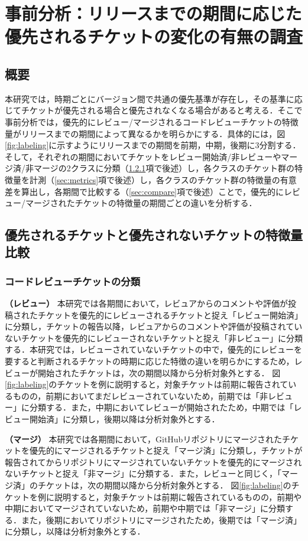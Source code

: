 \documentclass[submit]{ipsj}
\begin{document}
\section{事前分析：リリースまでの期間に応じた優先されるチケットの変化の有無の調査}\label{sec:pre_analysis}

\subsection{概要}
本研究では，時期ごとにバージョン間で共通の優先基準が存在し，その基準に応じてチケットが優先される場合と優先されなくなる場合があると考える．そこで事前分析では，優先的にレビュー/マージされるコードレビューチケットの特徴量がリリースまでの期間によって異なるかを明らかにする．具体的には，図\ref{fig:labeling}に示すようにリリースまでの期間を前期，中期，後期に3分割する．そして，それぞれの期間においてチケットをレビュー開始済/非レビューやマージ済/非マージの2クラスに分類（\ref{sec:bunrui}項で後述）し，各クラスのチケット群の特徴量を計測（\ref{sec:metrics}項で後述）し，各クラスのチケット群の特徴量の有意差を算出し，各期間で比較する（\ref{sec:compare}項で後述）ことで，優先的にレビュー/マージされたチケットの特徴量の期間ごとの違いを分析する．

\subsection{優先されるチケットと優先されないチケットの特徴量比較}
\subsubsection{コードレビューチケットの分類}\label{sec:bunrui}
\textbf{（レビュー）} 本研究では各期間において，レビュアからのコメントや評価が投稿されたチケットを優先的にレビューされるチケットと捉え「レビュー開始済」に分類し，チケットの報告以降，レビュアからのコメントや評価が投稿されていないチケットを優先的にレビューされないチケットと捉え「非レビュー」に分類する．本研究では，レビューされていないチケットの中で，優先的にレビューを要すると判断されるチケットの時期に応じた特徴の違いを明らかにするため，レビューが開始されたチケットは，次の期間以降から分析対象外とする．
図\ref{fig:labeling}のチケットを例に説明すると，対象チケットは前期に報告されているものの，前期においてまだレビューされていないため，前期では「非レビュー」に分類する．また，中期においてレビューが開始されたため，中期では「レビュー開始済」に分類し，後期以降は分析対象外とする．

\textbf{（マージ）} 本研究では各期間において，GitHubリポジトリにマージされたチケットを優先的にマージされるチケットと捉え「マージ済」に分類し，チケットが報告されてからリポジトリにマージされていないチケットを優先的にマージされないチケットと捉え「非マージ」に分類する．また，レビューと同じく，「マージ済」のチケットは，次の期間以降から分析対象外とする．
図\ref{fig:labeling}のチケットを例に説明すると，対象チケットは前期に報告されているものの，前期や中期においてマージされていないため，前期や中期では「非マージ」に分類する．また，後期においてリポジトリにマージされたため，後期では「マージ済」に分類し，以降は分析対象外とする．
\end{document}
